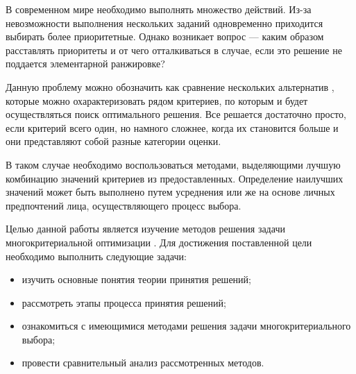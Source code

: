 \setcounter{page}{4}

В современном мире необходимо выполнять множество действий. Из-за невозможности выполнения нескольких заданий одновременно приходится выбирать более приоритетные. Однако возникает вопрос --- каким образом расставлять приоритеты и от чего отталкиваться в случае, если это решение не поддается элементарной ранжировке?

Данную проблему можно обозначить как сравнение нескольких альтернатив \cite{Larychev}, которые можно охарактеризовать рядом критериев, по которым и будет осуществляться поиск оптимального решения. Все решается достаточно просто, если критерий всего один, но намного сложнее, когда их становится больше и они представляют собой разные категории оценки.

В таком случае необходимо воспользоваться методами, выделяющими лучшую комбинацию значений критериев из предоставленных. Определение наилучших значений может быть выполнено путем усреднения или же на основе личных предпочтений лица, осуществляющего процесс выбора.

Целью данной работы является изучение методов решения задачи многокритериальной оптимизации \cite{mko}. Для достижения поставленной цели необходимо выполнить следующие задачи:
\begin{itemize}
	\item изучить основные понятия теории принятия решений;
	\item рассмотреть этапы процесса принятия решений;
	\item ознакомиться с имеющимися методами решения задачи многокритериального выбора;
	\item провести сравнительный анализ рассмотренных методов.
\end{itemize}